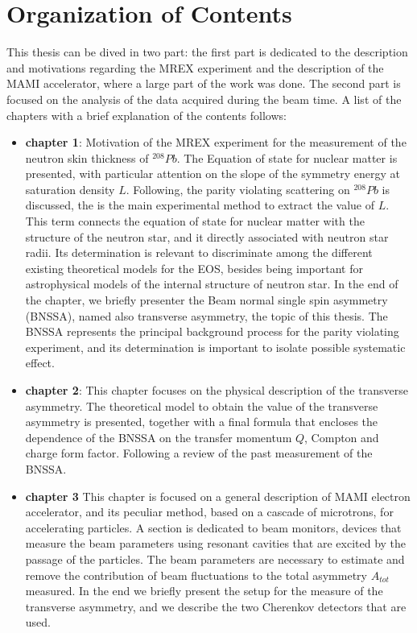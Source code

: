 \chapter*{Organization of Contents}

This thesis can be dived in two part: the first part is dedicated to the description and motivations regarding the MREX  experiment and the description of the MAMI accelerator, where a large part of the work was done. The second part is focused on the analysis of the data acquired during the beam time. A list of the chapters with a brief explanation of the contents follows:

\begin{itemize}
\item \textbf{chapter 1}: Motivation of the MREX experiment for the measurement of the neutron skin thickness of $^{208}Pb$. The Equation of state for nuclear matter is presented, with particular attention on the slope of the symmetry energy at saturation density $L$. Following, the parity violating scattering on $^{208}Pb$ is discussed, the is the main experimental method to extract the value of $L$. This term connects the equation of state for nuclear matter with the structure of the neutron star, and it directly associated with neutron star radii. Its determination is relevant to discriminate among the different existing theoretical models for the EOS, besides being important for astrophysical models of the internal structure of neutron star. In the end of the chapter, we briefly presenter the Beam normal single spin asymmetry (BNSSA), named also transverse asymmetry, the topic of this thesis. The BNSSA represents the principal background process for the parity violating experiment, and its determination is important to isolate possible systematic effect. 
\item \textbf{chapter 2}: This chapter focuses on the physical description of the transverse asymmetry. The theoretical model to obtain the value of the transverse asymmetry is presented, together with a final formula that encloses the dependence of the BNSSA on the transfer momentum $Q$, Compton and charge form factor. Following a review of the past measurement of the BNSSA.  
\item \textbf{chapter 3} This chapter is focused on a general description of MAMI electron accelerator, and its peculiar method, based on a cascade of microtrons, for accelerating particles. A section is dedicated to beam monitors, devices that measure the beam parameters using resonant cavities that are excited by the passage of the particles. The beam parameters are necessary to estimate and remove the contribution of beam fluctuations to the total asymmetry $A_{tot}$ measured. In the end we briefly present the setup for the measure of the transverse asymmetry, and we describe the two Cherenkov detectors that are used.

\end{itemize}
